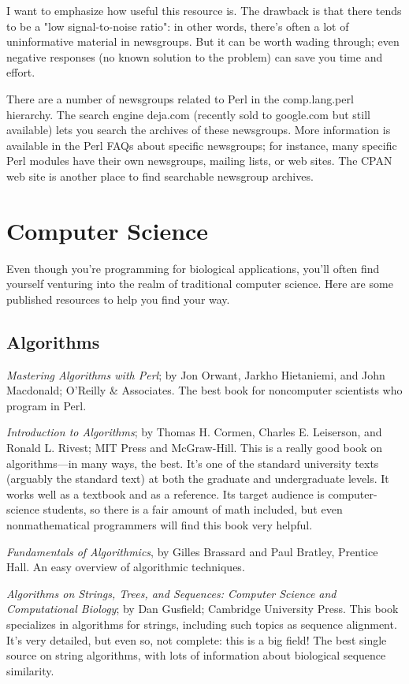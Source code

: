 I want to emphasize how useful this resource is. The drawback is that there tends to be a "low signal-to-noise ratio": in other words, there's often a lot of uninformative material in newsgroups. But it can be worth wading through; even negative responses (no known solution to the problem) can save you time and effort.

There are a number of newsgroups related to Perl in the comp.lang.perl hierarchy. The search engine deja.com (recently sold to google.com but still available) lets you search the archives of these newsgroups. More information is available in the Perl FAQs about specific newsgroups; for instance, many specific Perl modules have their own newsgroups, mailing lists, or web sites. The CPAN web site is another place to find searchable newsgroup archives.

\section{Computer Science}
Even though you're programming for biological applications, you'll often find yourself venturing into the realm of traditional computer science. Here are some published resources to help you find your way.

\subsection{Algorithms}
\textit{Mastering Algorithms with Perl}; by Jon Orwant, Jarkho Hietaniemi, and John Macdonald; O'Reilly \& Associates. The best book for noncomputer scientists who program in Perl.

\textit{Introduction to Algorithms}; by Thomas H. Cormen, Charles E. Leiserson, and Ronald L. Rivest; MIT Press and McGraw-Hill. This is a really good book on algorithms—in many ways, the best. It's one of the standard university texts (arguably the standard text) at both the graduate and undergraduate levels. It works well as a textbook and as a reference. Its target audience is computer-science students, so there is a fair amount of math included, but even nonmathematical programmers will find this book very helpful.

\textit{Fundamentals of Algorithmics}, by Gilles Brassard and Paul Bratley, Prentice Hall. An easy overview of algorithmic techniques.

\textit{Algorithms on Strings, Trees, and Sequences: Computer Science and Computational Biology}; by Dan Gusfield; Cambridge University Press. This book specializes in algorithms for strings, including such topics as sequence alignment. It's very detailed, but even so, not complete: this is a big field! The best single source on string algorithms, with lots of information about biological sequence similarity.

